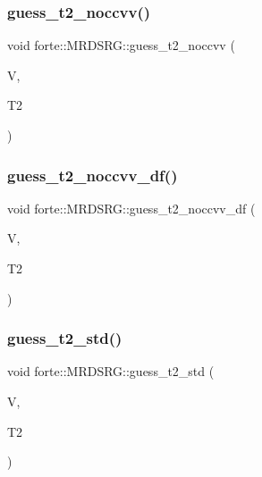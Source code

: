 \subsubsection{\texorpdfstring{guess\+\_\+t2\+\_\+noccvv()}{guess\_t2\_noccvv()}}
{\footnotesize\ttfamily void forte\+::\+M\+R\+D\+S\+R\+G\+::guess\+\_\+t2\+\_\+noccvv (\begin{DoxyParamCaption}\item[{Blocked\+Tensor \&}]{V,  }\item[{Blocked\+Tensor \&}]{T2 }\end{DoxyParamCaption})\hspace{0.3cm}{\ttfamily [protected]}}

\mbox{\label{classforte_1_1_m_r_d_s_r_g_ae4c2beaae974b74ce8634f67699a581c}} 
\subsubsection{\texorpdfstring{guess\+\_\+t2\+\_\+noccvv\+\_\+df()}{guess\_t2\_noccvv\_df()}}
{\footnotesize\ttfamily void forte\+::\+M\+R\+D\+S\+R\+G\+::guess\+\_\+t2\+\_\+noccvv\+\_\+df (\begin{DoxyParamCaption}\item[{Blocked\+Tensor \&}]{V,  }\item[{Blocked\+Tensor \&}]{T2 }\end{DoxyParamCaption})\hspace{0.3cm}{\ttfamily [protected]}}

\mbox{\label{classforte_1_1_m_r_d_s_r_g_a3b886b732fb444027c06e80d1f44c330}} 
\subsubsection{\texorpdfstring{guess\+\_\+t2\+\_\+std()}{guess\_t2\_std()}}
{\footnotesize\ttfamily void forte\+::\+M\+R\+D\+S\+R\+G\+::guess\+\_\+t2\+\_\+std (\begin{DoxyParamCaption}\item[{Blocked\+Tensor \&}]{V,  }\item[{Blocked\+Tensor \&}]{T2 }\end{DoxyParamCaption})\hspace{0.3cm}{\ttfamily [protected]}}



